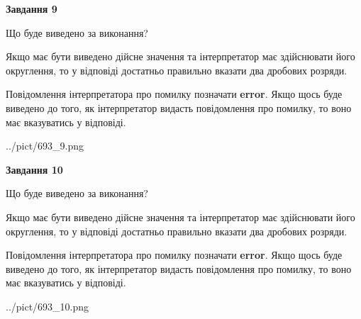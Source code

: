 \documentclass[12pt, ukrainian]{article}
\begin{document}
{\begin {Large}
{\begin {center}\textbf{Завдання 9}\end {center}}\par
Що буде виведено за виконання? \par

Якщо має бути виведено дійсне значення та інтерпретатор має здійснювати його округлення, 
то у відповіді достатньо правильно вказати два дробових розряди.

Повідомлення інтерпретатора про помилку позначати \textbf{error}.
Якщо щось буде виведено до того, як інтерпретатор видасть повідомлення про помилку, 
то воно має вказуватись у відповіді. \par

\begin{center}
	{../pict/693_9.png}
\end{center}
\newpage

{\begin {center}\textbf{Завдання 10}\end {center}}\par
Що буде виведено за виконання? \par

Якщо має бути виведено дійсне значення та інтерпретатор має здійснювати його округлення, 
то у відповіді достатньо правильно вказати два дробових розряди.

Повідомлення інтерпретатора про помилку позначати \textbf{error}.
Якщо щось буде виведено до того, як інтерпретатор видасть повідомлення про помилку, 
то воно має вказуватись у відповіді. \par

\begin{center}
	{../pict/693_10.png}
\end{center}
\newpage

\end {Large}}
\end{document}
